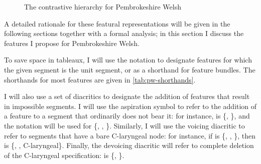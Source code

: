 \begin{figure}
{}
\caption{The contrastive hierarchy for Pembrokeshire Welsh}
\label{fig:welsh-hierarchy}
\end{figure} A detailed rationale for these featural representations will be given in the following sections together with a formal analysis; in this section I discuss the features I propose for Pembrokeshire Welsh.

To save space in tableaux, I will use the notation  to designate features for which the given segment is the unit segment, or as a shorthand for feature bundles. The shorthands for most features are given in  \cref{tab:pw-shorthands}.

\label{pw-diacritics}I will also use a set of diacritics to designate the addition of features that result in impossible segments. I will use the aspiration symbol \ipa{[ʰ]} to refer to the addition of a  feature to a segment that ordinarily does not bear it: for instance, \ipa{[n]} is \{, \}, and the notation \ipa{[nʰ]} will be used for \{, , \}. Similarly, I will use the voicing diacritic to refer to segments that have a bare C-laryngeal node: for instance, if \ipa{[θ]} is \{, , \}, then \ipa{[θ̬]} is \{, , C-laryngeal\}. Finally, the devoicing diacritic will refer to complete deletion of the C-laryngeal specification: \ipa{[θ̥]} is \{, \}.

